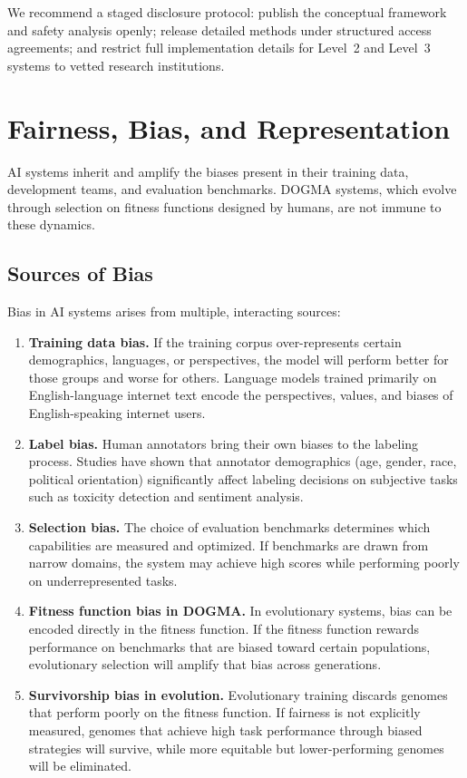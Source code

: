 We recommend a staged disclosure protocol: publish the conceptual framework and safety analysis openly; release detailed methods under structured access agreements; and restrict full implementation details for Level~2 and Level~3 systems to vetted research institutions.

\section{Fairness, Bias, and Representation}
\label{sec:fairness-bias}

AI systems inherit and amplify the biases present in their training data, development teams, and evaluation benchmarks.
DOGMA systems, which evolve through selection on fitness functions designed by humans, are not immune to these dynamics.

\subsection{Sources of Bias}

Bias in AI systems arises from multiple, interacting sources:

\begin{enumerate}[leftmargin=1.8em]
  \item \textbf{Training data bias.} If the training corpus over-represents certain demographics, languages, or perspectives, the model will perform better for those groups and worse for others.
  Language models trained primarily on English-language internet text encode the perspectives, values, and biases of English-speaking internet users.

  \item \textbf{Label bias.} Human annotators bring their own biases to the labeling process.
  Studies have shown that annotator demographics (age, gender, race, political orientation) significantly affect labeling decisions on subjective tasks such as toxicity detection and sentiment analysis.

  \item \textbf{Selection bias.} The choice of evaluation benchmarks determines which capabilities are measured and optimized.
  If benchmarks are drawn from narrow domains, the system may achieve high scores while performing poorly on underrepresented tasks.

  \item \textbf{Fitness function bias in DOGMA.} In evolutionary systems, bias can be encoded directly in the fitness function.
  If the fitness function rewards performance on benchmarks that are biased toward certain populations, evolutionary selection will amplify that bias across generations.

  \item \textbf{Survivorship bias in evolution.} Evolutionary training discards genomes that perform poorly on the fitness function.
  If fairness is not explicitly measured, genomes that achieve high task performance through biased strategies will survive, while more equitable but lower-performing genomes will be eliminated.
\end{enumerate}

